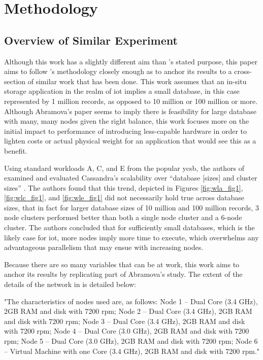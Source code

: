 \chapter{Methodology}

\section{Overview of Similar Experiment}

Although this work has a slightly different aim than \cite{Abramova2014}'s stated purpose, this paper aims to follow \cite{Abramova2014}'s methodology closely enough as to anchor its results to a cross-section of similar work that has been done.  This work assumes that an in-situ storage application in the realm of \gls{iot} implies a small database, in this case represented by 1 million records, as opposed to 10 million or 100 million or more.  Although Abramova’s paper seems to imply there is feasibility for large database with many, many nodes given the right balance, this work focuses more on the initial impact to performance of introducing less-capable hardware in order to lighten costs or actual physical weight for an application that would see this as a benefit.

Using standard workloads A, C, and E from the popular \gls{ycsb}, the authors of \cite{Abramova2014} examined and evaluated Cassandra’s scalability over “database [sizes] and cluster sizes” \cite{Abramova2014}.  The authors found that this trend, depicted in Figures \ref{fig:wla_fig1}, \ref{fig:wlc_fig1}, and \ref{fig:wle_fig1} did not necessarily hold true across database sizes, that in fact for larger database sizes of 10 million and 100 million records, 3 node clusters performed better than both a single node cluster and a 6-node cluster.  The authors concluded that for sufficiently small databases, which is the likely case for \gls{iot}, more nodes imply more time to execute, which overwhelms any advantageous parallelism that may ensue with increasing nodes.

Because there are so many variables that can be at work, this work aims to anchor its results by replicating part of Abramova’s study.  The extent of the details of the network in \cite{Abramova2014} is detailed below:  

"The characteristics of nodes used are, as follows: Node 1 – Dual Core (3.4 GHz), 2GB RAM and disk with 7200 rpm; Node 2 – Dual Core (3.4 GHz), 2GB RAM and disk with 7200 rpm; Node 3 – Dual Core (3.4 GHz), 2GB RAM and disk with 7200 rpm; Node 4 – Dual Core (3.0 GHz), 2GB RAM and disk with 7200 rpm; Node 5 – Dual Core (3.0 GHz), 2GB RAM and disk with 7200 rpm; Node 6 – Virtual Machine with one Core (3.4 GHz), 2GB RAM and disk with 7200 rpm." \cite{Abramova2014}

